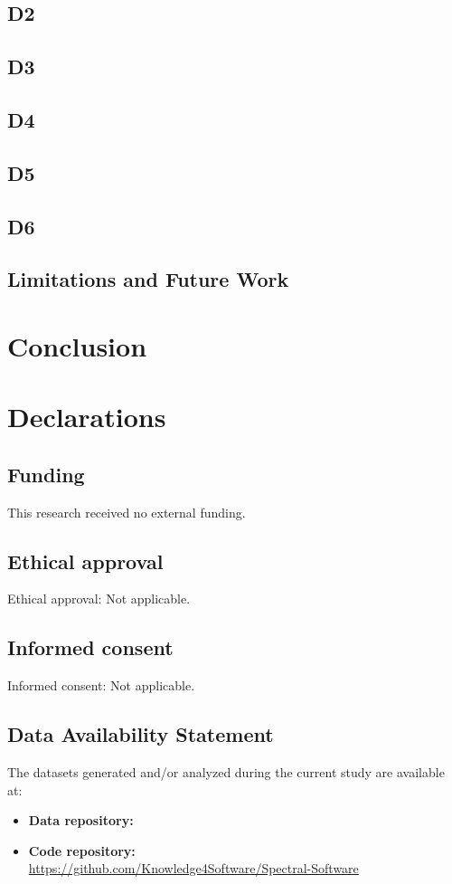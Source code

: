 \documentclass[authoryear,final,5p,times,twocolumn]{elsarticle}
\theoremstyle{plain}
\begin{document}
\subsection{D2}
\label{sec:d2}
\subsection{D3}
\label{sec:d3}
\subsection{D4}
\label{sec:d4}
\subsection{D5}
\label{sec:d5}
\subsection{D6}
\label{sec:d6}

\subsection{Limitations and Future Work}
\label{sec:limitations}

\section{Conclusion}
\label{sec:conclusion}

\section{Declarations}

\subsection{Funding}
This research received no external funding.

\subsection{Ethical approval}
Ethical approval: Not applicable.

\subsection{Informed consent}
Informed consent: Not applicable.

\subsection{Data Availability Statement}
The datasets generated and/or analyzed during the current study are available at:
\begin{itemize}
    \item \textbf{Data repository:}\\ 
    \item \textbf{Code repository:}\\ \url{https://github.com/Knowledge4Software/Spectral-Software}
\end{itemize}
\end{document}
